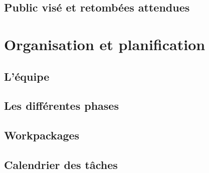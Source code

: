 \documentclass{article}
\begin{document}
\subsection{Public visé et retombées attendues}

\section{Organisation et planification}

\subsection{L'équipe} 

\subsection{Les différentes phases}

\subsection{Workpackages}

\subsection{Calendrier des tâches}
\end{document}
